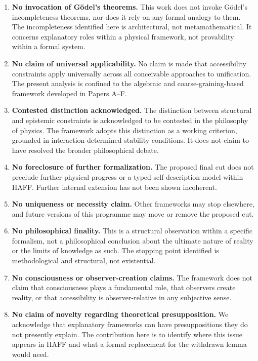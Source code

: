 \documentclass[12pt,a4paper,openany]{book}
\begin{document}
\begin{enumerate}
    \item \textbf{No invocation of G\"{o}del's theorems.} This work does not invoke G\"{o}del's incompleteness theorems, nor does it rely on any formal analogy to them. The incompleteness identified here is architectural, not metamathematical. It concerns explanatory roles within a physical framework, not provability within a formal system.
    
    \item \textbf{No claim of universal applicability.} No claim is made that accessibility constraints apply universally across all conceivable approaches to unification. The present analysis is confined to the algebraic and coarse-graining-based framework developed in Papers A--F.
    
    \item \textbf{Contested distinction acknowledged.} The distinction between structural and epistemic constraints is acknowledged to be contested in the philosophy of physics. The framework adopts this distinction as a working criterion, grounded in interaction-determined stability conditions. It does not claim to have resolved the broader philosophical debate.
    
    \item \textbf{No foreclosure of further formalization.} The proposed final cut does not preclude further physical progress or a typed self-description model within HAFF.  Further internal extension has not been shown incoherent.
    
    \item \textbf{No uniqueness or necessity claim.} Other frameworks may stop elsewhere, and future versions of this programme may move or remove the proposed cut.
    
    \item \textbf{No philosophical finality.} This is a structural observation within a specific formalism, not a philosophical conclusion about the ultimate nature of reality or the limits of knowledge as such. The stopping point identified is methodological and structural, not existential.
    
    \item \textbf{No consciousness or observer-creation claims.} The framework does not claim that consciousness plays a fundamental role, that observers create reality, or that accessibility is observer-relative in any subjective sense.
    
    \item \textbf{No claim of novelty regarding theoretical presupposition.} We acknowledge that explanatory frameworks can have presuppositions they do not presently explain.  The contribution here is to identify where this issue appears in HAFF and what a formal replacement for the withdrawn lemma would need.
\end{enumerate}
\end{document}

